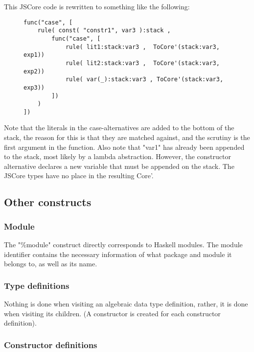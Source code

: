 This JSCore code is rewritten to something like the following:

\begin{figure}[H]
\lstset{ %
language=Haskell,
caption=JSCore case expression in Core',
}
\begin{lstlisting}
func("case", [
    rule( const( "constr1", var3 ):stack ,
        func("case", [  
            rule( lit1:stack:var3 ,  ToCore'(stack:var3, exp1))
            rule( lit2:stack:var3 ,  ToCore'(stack:var3, exp2))
            rule( var(_):stack:var3 , ToCore'(stack:var3, exp3))
        ])
    )
])
\end{lstlisting}
\end{figure}

Note that the literals in the case-alternatives are added to the bottom of the stack,
the reason for this is that they are matched against, and the scrutiny is the first
argument in the function.
Also note that "var1" has already
been appended to the stack, most likely by a lambda abstraction. However, 
the constructor
alternative declares a new variable that must be appended on the stack.
The JSCore types have no place in the resulting Core'.

\subsection*{Other constructs}

\subsubsection*{Module}

The "\%module" construct directly corresponds to Haskell modules. The module identifier
contains the necessary information of what package and module it belongs to, as
well as its name.

\subsubsection*{Type definitions}

Nothing is done when visiting an algebraic data type definition, rather, it is done when 
visiting its children. (A constructor is created for each constructor definition).

\subsubsection*{Constructor definitions}

